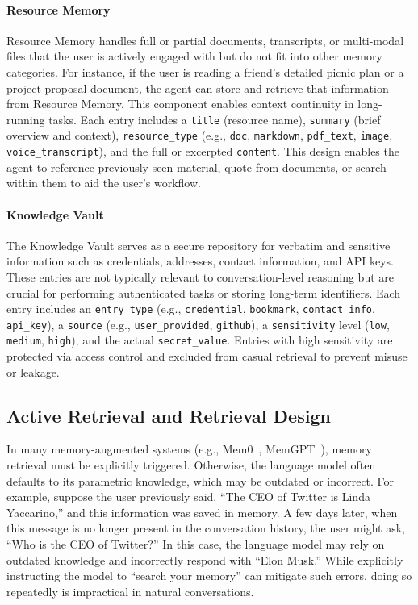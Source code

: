 \paragraph{Resource Memory} 
Resource Memory handles full or partial documents, transcripts, or multi-modal files that the user is actively engaged with but do not fit into other memory categories. For instance, if the user is reading a friend's detailed picnic plan or a project proposal document, the agent can store and retrieve that information from Resource Memory. This component enables context continuity in long-running tasks. Each entry includes a \texttt{title} (resource name), \texttt{summary} (brief overview and context), \texttt{resource\_type} (e.g., \texttt{doc}, \texttt{markdown}, \texttt{pdf\_text}, \texttt{image}, \texttt{voice\_transcript}), and the full or excerpted \texttt{content}. This design enables the agent to reference previously seen material, quote from documents, or search within them to aid the user’s workflow.

\paragraph{Knowledge Vault} 
The Knowledge Vault serves as a secure repository for verbatim and sensitive information such as credentials, addresses, contact information, and API keys. These entries are not typically relevant to conversation-level reasoning but are crucial for performing authenticated tasks or storing long-term identifiers. Each entry includes an \texttt{entry\_type} (e.g., \texttt{credential}, \texttt{bookmark}, \texttt{contact\_info}, \texttt{api\_key}), a \texttt{source} (e.g., \texttt{user\_provided}, \texttt{github}), a \texttt{sensitivity} level (\texttt{low}, \texttt{medium}, \texttt{high}), and the actual \texttt{secret\_value}. Entries with high sensitivity are protected via access control and excluded from casual retrieval to prevent misuse or leakage.

\subsection{Active Retrieval and Retrieval Design}
In many memory-augmented systems (e.g., Mem0~\citep{mem0}, MemGPT~\citep{memgpt}), memory retrieval must be explicitly triggered. Otherwise, the language model often defaults to its parametric knowledge, which may be outdated or incorrect. For example, suppose the user previously said, “The CEO of Twitter is Linda Yaccarino,” and this information was saved in memory. A few days later, when this message is no longer present in the conversation history, the user might ask, “Who is the CEO of Twitter?” In this case, the language model may rely on outdated knowledge and incorrectly respond with “Elon Musk.” While explicitly instructing the model to “search your memory” can mitigate such errors, doing so repeatedly is impractical in natural conversations.

